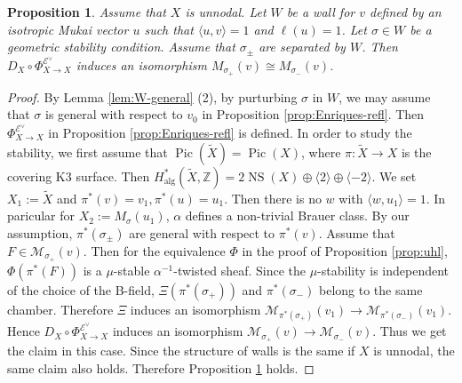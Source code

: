 \documentclass[leqno,11pt]{amsart}
\def\alg{\mathrm{alg}}
\def\NS{\mathop{\mathrm{NS}}\nolimits}
\def\Pic{\mathop{\mathrm{Pic}}\nolimits}
\newtheorem{Prop}[Thm]{Proposition}
\theoremstyle{definition}
\def\EE{\ensuremath{\mathcal E}}
\def\MM{\ensuremath{\mathcal M}}
\def\Bbb{\mathbb}
\begin{document}
\begin{Prop}\label{prop:LGUK3}
Assume that $X$ is unnodal.
Let $W$ be a wall for $v$ defined by an isotropic Mukai vector
$u$ such that $\langle u,v \rangle=1$ and $\ell(u)=1$.
Let $\sigma \in W$ be a geometric stability condition.
Assume that $\sigma_\pm$ are separated by $W$.
Then 
$D_X \circ \Phi_{X \to X}^{\EE^{\vee}}$ induces an isomorphism
$M_{\sigma_+}(v) \cong M_{\sigma_-}(v)$.
\end{Prop}

\begin{proof}
By Lemma \ref{lem:W-general} (2),
by purturbing $\sigma$ in $W$,
we may assume that $\sigma$
is general with respect to $v_0$ in Proposition \ref{prop:Enriques-refl}.
Then $\Phi_{X \to X}^{\EE^{\vee}}$ in Proposition \ref{prop:Enriques-refl}
is defined. In order to study the stability,
we first assume that $\Pic(\widetilde{X})=\Pic(X)$, where
$\pi:\widetilde{X} \to X$ is the covering K3 surface.
Then $H^*_{\alg}(\widetilde{X},{\Bbb Z})=2 \NS(X) \oplus \langle 2 \rangle
\oplus \langle -2 \rangle$.
We set $X_1:=\widetilde{X}$ and
$\pi^*(v)=v_1,\pi^*(u)=u_1$.
Then there is no $w$ with $\langle w,u_1 \rangle=1$.
In paricular for $X_2:=M_\sigma(u_1)$,
$\alpha$ defines a non-trivial Brauer class.
By our assumption, $\pi^*(\sigma_\pm)$ are general with respect to $\pi^*(v)$. 
Assume that $F \in \MM_{\sigma_+}(v)$.
Then for the equivalence $\Phi$ in the proof of Proposition \ref{prop:uhl},
$\Phi(\pi^*(F))$ is a $\mu$-stable $\alpha^{-1}$-twisted sheaf.
Since the $\mu$-stability is independent of the choice of the B-field,
$\Xi(\pi^*(\sigma_+))$ and $\pi^*(\sigma_-)$ belong to the same chamber.
Therefore $\Xi$ induces an isomorphism
$\MM_{\pi^*(\sigma_+)}(v_1) \to \MM_{\pi^*(\sigma_-)}(v_1)$.  
Hence $D_X \circ \Phi_{X \to X}^{\EE^{\vee}}$ induces
an isomorphism $\MM_{\sigma_+}(v) \to \MM_{\sigma_-}(v)$.
Thus we get the claim in this case.
Since the structure of walls is the same if $X$ is unnodal,
the same claim also holds. Therefore Proposition \ref{prop:LGUK3} holds.
\end{proof}
\end{document}
